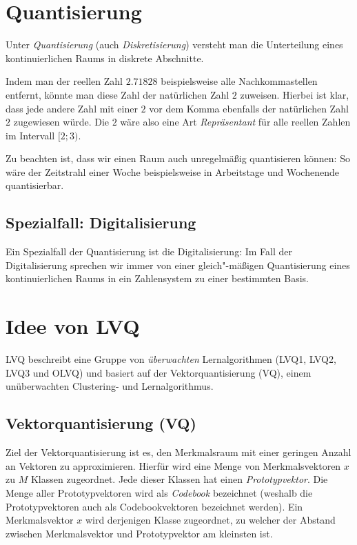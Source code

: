 \section*{Quantisierung}
Unter \emph{Quantisierung} (auch \emph{Diskretisierung}) versteht man die Unterteilung eines kontinuierlichen Raums in diskrete Abschnitte.

Indem man der reellen Zahl $2.71828$ beispielsweise alle Nachkommastellen entfernt, könnte man diese Zahl der natürlichen Zahl $2$ zuweisen. Hierbei ist klar, dass jede andere Zahl mit einer $2$ vor dem Komma ebenfalls der natürlichen Zahl $2$ zugewiesen würde. Die $2$ wäre also eine Art \emph{Repräsentant} für alle reellen Zahlen im Intervall $[2; 3)$.

Zu beachten ist, dass wir einen Raum auch unregelmäßig quantisieren können: So wäre der Zeitstrahl einer Woche beispielsweise in Arbeitstage und Wochenende quantisierbar.

\subsection*{Spezialfall: Digitalisierung}
Ein Spezialfall der Quantisierung ist die Digitalisierung: Im Fall der Digitalisierung sprechen wir immer von einer gleich"-mäßigen Quantisierung eines kontinuierlichen Raums in ein Zahlensystem zu einer bestimmten Basis.



\section*{Idee von LVQ}
LVQ beschreibt eine Gruppe von \emph{überwachten} Lernalgorithmen (LVQ1, LVQ2, LVQ3 und OLVQ) und basiert auf der Vektorquantisierung (VQ), einem unüberwachten Clustering- und Lernalgorithmus.

\subsection*{Vektorquantisierung (VQ)}
Ziel der Vektorquantisierung ist es, den Merkmalsraum mit einer geringen Anzahl an Vektoren zu approximieren.
Hierfür wird eine Menge von Merkmalsvektoren $x$ zu $M$ Klassen zugeordnet. Jede dieser Klassen hat einen \emph{Prototypvektor}. Die Menge aller Prototypvektoren wird als \emph{Codebook} bezeichnet (weshalb die Prototypvektoren auch als Codebookvektoren bezeichnet werden).
Ein Merkmalsvektor $x$ wird derjenigen Klasse zugeordnet, zu welcher der Abstand zwischen Merkmalsvektor und Prototypvektor am kleinsten ist.

